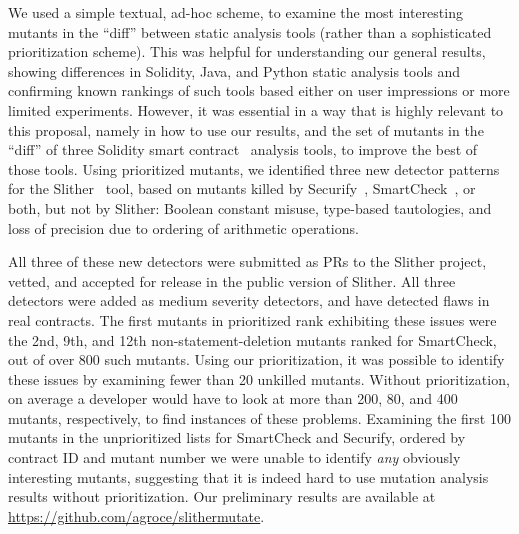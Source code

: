 We used a
simple textual, ad-hoc scheme, to examine the most
interesting mutants in the ``diff'' between static analysis tools (rather than a
sophisticated prioritization scheme).
This was helpful for understanding our general results, showing
differences in Solidity, Java, and Python static analysis tools and
confirming known rankings of such tools based either on user
impressions or more limited experiments.  However, it was essential in a way
that is highly relevant to this proposal, namely in how to use our
results, and the set of mutants in the ``diff'' of three Solidity
smart contract~\cite{buterin2013whitepaper,wood2014yellow} analysis tools, to improve the best of those tools.
Using prioritized mutants, we
identified three new 
detector patterns for the Slither~\cite{slitherpaper} tool, based on mutants killed by
Securify~\cite{securify}, SmartCheck~\cite{sc:smartcheck}, or both, but not by Slither:  Boolean constant
misuse, type-based tautologies, and loss of precision due to ordering
of arithmetic operations.

All three of these new detectors were submitted as PRs to the Slither
project, vetted,  and accepted for
release in the public version of Slither.  All three detectors were
added as medium
severity detectors, and have detected flaws in real contracts.  The first mutants in prioritized rank exhibiting
these issues were the 2nd, 9th, and 12th
non-statement-deletion mutants ranked for SmartCheck, out of over 800
such mutants.  Using our prioritization, it was possible to identify
these issues by examining fewer than 20 unkilled mutants.  Without
prioritization, on average a developer would have to look at more than
200, 80, and 400 mutants, respectively, to find instances of these
problems.  Examining the first 100 mutants in the unprioritized lists for
SmartCheck and Securify, ordered by contract ID and mutant number we were unable to identify \emph{any} obviously interesting
mutants, suggesting that it is indeed hard to use mutation analysis results
without prioritization.  Our preliminary results are available at
\url{https://github.com/agroce/slithermutate}.


